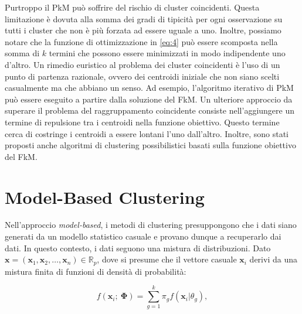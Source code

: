\documentclass[12pt]{article}
\begin{document}
Purtroppo il PkM può soffrire del rischio di cluster coincidenti. Questa limitazione è dovuta alla somma dei gradi di tipicità per ogni osservazione su tutti i cluster che non è più forzata ad essere uguale a uno. Inoltre, possiamo notare che la funzione di ottimizzazione in \eqref{eq:4} può essere scomposta nella somma di $k$ termini che possono essere minimizzati in modo indipendente uno d'altro. Un rimedio euristico al problema dei cluster coincidenti è l'uso di un punto di partenza razionale, ovvero dei centroidi iniziale che non siano scelti casualmente ma che abbiano un senso. Ad esempio, l'algoritmo iterativo di PkM può essere eseguito a partire dalla soluzione del FkM. Un ulteriore approccio da superare il problema del raggruppamento coincidente consiste nell'aggiungere un termine di repulsione tra i centroidi nella funzione obiettivo. Questo termine cerca di costringe i centroidi a essere lontani l'uno dall'altro. Inoltre, sono stati proposti anche algoritmi di clustering possibilistici basati sulla funzione obiettivo del FkM.

\section{Model-Based Clustering}

Nell'approccio \textit{model-based}, i metodi di clustering presuppongono che i dati siano generati da un modello statistico casuale e provano dunque a recuperarlo dai dati. In questo contesto, i dati seguono una mistura di distribuzioni. Dato $\mathbf{x} = (\mathbf{x}_1, \mathbf{x}_2, \dots, \mathbf{x}_n) \in \mathbb{R}_p$, dove si presume che il vettore casuale $\mathbf{x}_i$ derivi da una mistura finita di funzioni di densità di probabilità:

\begin{equation}
	f(\mathbf{x}_i;\ \boldsymbol{\Phi}) = \sum_{g=1}^{k} \pi_g f(\mathbf{x}_i|\theta_g),
	\label{eq:8}
\end{equation}
\end{document}
